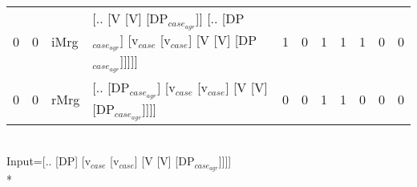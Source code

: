 \begin{tabularx}{\linewidth}{rrlXrrrrrrr}
   0 &   0 & iMrg & [.. [V [V] [DP$_{case_{agr}}$]] [.. [DP$_{case_{agr}}$] [v$_{case}$ [v$_{case}$] [V [V] [DP$_{case_{agr}}$]]]]]                   &            1 &              0 &             1 &             1 &                  1 &                0 &              0 \\
   0 &   0 & rMrg & [.. [DP$_{case_{agr}}$] [v$_{case}$ [v$_{case}$] [V [V] [DP$_{case_{agr}}$]]]]                                              &            0 &              0 &             1 &             1 &                  0 &                0 &              0 \\
\hline
\end{tabularx}\endgroup\\
\begingroup\scriptsize Input=[.. [DP] [v$_{case}$ [v$_{case}$] [V [V] [DP$_{case_{agr}}$]]]]\\*
